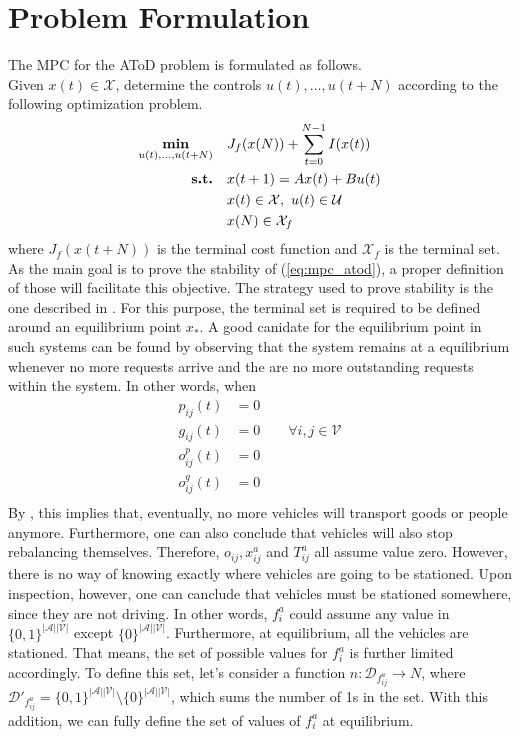 \section{Problem Formulation}
The MPC for the AToD problem is formulated as follows. \\
Given $x(t) \in \mathcal{X}$, determine the controls $u(t), \dots, u(t+N)$ according to the following optimization problem.
\begin{equation}
	\begin{aligned}
		\underset{\substack{u(t), \dots, u(t+N)}}{\text{\textbf{min}}} \quad & J_f(x(N))+\sum_{t=0}^{N-1}I(x(t)) \\
		\text{\textbf{s.t.}} \quad & x(t+1) = Ax(t) + Bu(t)  \\
		& x(t) \in \mathcal{X}, \ u(t)\in \mathcal{U} \\
		&x(N) \in \mathcal{X}_f\\
	\end{aligned}
	\label{eq:mpc_atod}
\end{equation}
where $J_f(x(t+N))$ is the terminal cost function and $\mathcal{X}_f$ is the terminal set. \\
As the main goal is to prove the stability of (\ref{eq:mpc_atod}), a proper definition of those will facilitate this objective. The strategy used to prove stability is the one described in . For this purpose, the terminal set is required to be defined around an equilibrium point $x_*$. A good canidate for the equilibrium point in such systems can be found by observing that the system remains at a equilibrium whenever no more requests arrive and the are no more outstanding requests within the system. In other words, when 
\begin{align*}
	p_{ij}(t) &=0 \\
	g_{ij}(t) &=0\quad\quad \forall i,j\in\mathcal{V}\\
	o^p_{ij}(t) &=0\\
	o^g_{ij}(t) &=0\\
\end{align*}
By , this implies that, eventually, no more vehicles will transport goods or people anymore. Furthermore, one can also conclude that vehicles will also stop rebalancing themselves. Therefore, $o_{ij}, x_{ij}^a$ and $T_{ij}^a$ all assume value zero. However, there is no way of knowing exactly where vehicles are going to be stationed. Upon inspection, however, one can canclude that vehicles must be stationed somewhere, since they are not driving. In other words, $f^a_{i}$ could assume any value in $\{0,1\}^{|\mathcal{A}||\mathcal{V}|} $ except $ \{0\}^{|\mathcal{A}||\mathcal{V}|}$. Furthermore, at equilibrium, all the vehicles are stationed. That means, the set of possible values for  $f^a_{i}$ is further limited accordingly. To define this set, let's consider a function $n : \mathcal{D}_{f^a_{ij}} \rightarrow N$, where $\mathcal{D}'_{f^a_{ij}}  = \{0,1\}^{|\mathcal{A}||\mathcal{V}|} \setminus \{0\}^{|\mathcal{A}||\mathcal{V}|}$, which sums the number of 1s in the set. With this addition, we can fully define the set of values of $f^a_{i}$  at equilibrium. 
